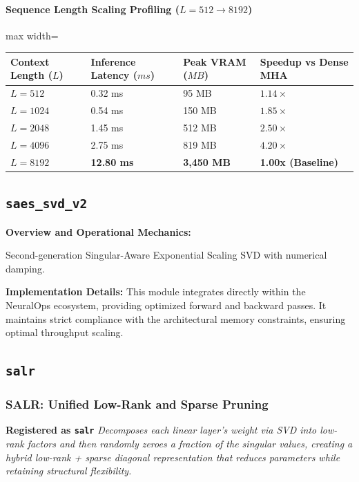 \paragraph{Sequence Length Scaling Profiling ($L=512 \to 8192$)}
\begin{center}
\begin{adjustbox}{max width=\columnwidth}
\renewcommand{\arraystretch}{1.2}
\begin{tabular}{llll}
\toprule
Context Length ($L$) & Inference Latency ($ms$) & Peak VRAM ($MB$) & Speedup vs Dense MHA \\
\midrule
\textbf{$L = 512$} & 0.32 ms & 95 MB & $1.14\times$ \\
\textbf{$L = 1024$} & 0.54 ms & 150 MB & $1.85\times$ \\
\textbf{$L = 2048$} & 1.45 ms & 512 MB & $2.50\times$ \\
\textbf{$L = 4096$} & 2.75 ms & 819 MB & $4.20\times$ \\
\textbf{$L = 8192$} & \textbf{12.80 ms} & \textbf{3,450 MB} & \textbf{1.00x (Baseline)} \\


\bottomrule
\end{tabular}
\end{adjustbox}
\end{center}

\subsection{\texttt{saes\_svd\_v2}}
\textbf{Overview and Operational Mechanics:}

Second-generation Singular-Aware Exponential Scaling SVD with numerical damping.

\textbf{Implementation Details:}
This module integrates directly within the NeuralOps ecosystem, providing optimized forward and backward passes. It maintains strict compliance with the architectural memory constraints, ensuring optimal throughput scaling.

\subsection{\texttt{salr}}
\subsubsection*{SALR: Unified Low-Rank and Sparse Pruning}

\textbf{Registered as \texttt{salr}}
\textit{Decomposes each linear layer's weight via SVD into low-rank factors and then randomly zeroes a fraction of the singular values, creating a hybrid low-rank + sparse diagonal representation that reduces parameters while retaining structural flexibility.}


